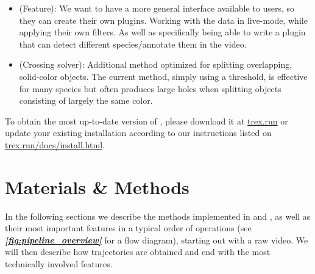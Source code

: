 \documentclass[9pt,lineno]{elife}
\newcommand{\figref}[1]{\textit{\textbf{\ref{#1}}}}
\newcommand{\TRex}{\protect\path{TRex}}
\newcommand{\TGrabs}{\protect\path{TGrabs}}
\newcommand{\changemade}[1]{#1}
\begin{document}
\begin{itemize}
    \item (Feature): We want to have a more general interface available to users, so they can create their own plugins. Working with the data in live-mode, while applying their own filters. As well as specifically being able to write a plugin that can detect different species/annotate them in the video.
    \item (Crossing solver): Additional method optimized for splitting overlapping, solid-color objects. The current method, simply using a threshold, is effective for many species but often produces large holes when splitting objects consisting of largely the same color.
\end{itemize}

To obtain the most up-to-date version of \TRex{}, please download it at \href{https://trex.run}{trex.run} or update your existing installation according to our instructions listed on \href{https://trex.run/docs/install.html}{trex.run/docs/install.html}.

\section{Materials \& Methods}

\changemade{In the following sections we describe the methods implemented in \TRex{} and \TGrabs{}, as well as their most important features in a typical order of operations (see \figref{fig:pipeline_overview} for a flow diagram), starting out with a raw video. We will then describe how trajectories are obtained and end with the most technically involved features.}

\end{document}
